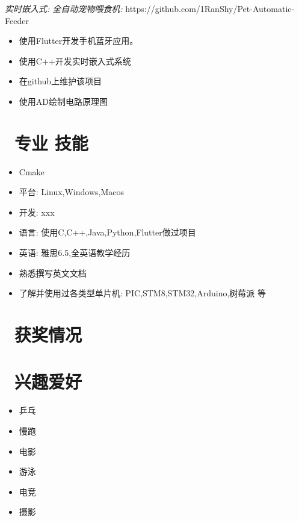 \documentclass{resume}
\begin{document}
\textit{实时嵌入式: 全自动宠物喂食机:} https://github.com/1RanShy/Pet-Automatic-Feeder
\begin{itemize}
  \item 使用Flutter开发手机蓝牙应用。
  \item 使用C++开发实时嵌入式系统
  \item 在github上维护该项目
  \item 使用AD绘制电路原理图
\end{itemize}


\section{\faCogs\ 专业 技能}
\begin{itemize}[parsep=0.5ex]
  \item Cmake
  \item 平台: Linux,Windows,Macos
  \item 开发: xxx
  \item 语言: 使用C,C++,Java,Python,Flutter做过项目
  \item 英语: 雅思6.5,全英语教学经历
  \item 熟悉撰写英文文档
  \item 了解并使用过各类型单片机: PIC,STM8,STM32,Arduino,树莓派 等
\end{itemize}

\section{\faHeartO\ 获奖情况}



\section{\faBook\ 兴趣爱好}
\begin{itemize}[parsep=0.5ex]
  \item 乒乓
  \item 慢跑
  \item 电影
  \item 游泳
  \item 电竞
  \item 摄影
\end{itemize}
\end{document}
